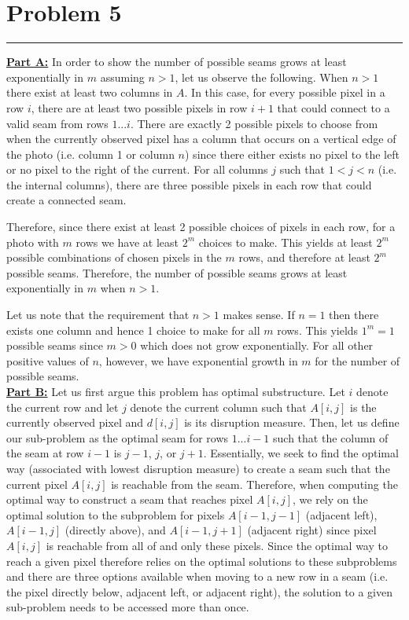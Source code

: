 \documentclass[11pt]{article}
\def\separateline{\medskip\hrule\medskip}
\begin{document}
\newpage

\section{Problem 5}
\separateline

\textbf{\underline{Part A:}} In order to show the number of possible seams grows at least exponentially in $m$ assuming $n > 1$, let us observe the following. When $n > 1$ there exist at least two columns in $A$. In this case, for every possible pixel in a row $i$, there are at least two possible pixels in row $i+1$ that could connect to a valid seam from rows $1...i$. There are exactly 2 possible pixels to choose from when the currently observed pixel has a column that occurs on a vertical edge of the photo (i.e. column 1 or column $n$) since there either exists no pixel to the left or no pixel to the right of the current. For all columns $j$ such that $1 < j < n$ (i.e. the internal columns), there are three possible pixels in each row that could create a connected seam.

Therefore, since there exist at least 2 possible choices of pixels in each row, for a photo with $m$ rows we have at least $2^m$ choices to make. This yields at least $2^m$ possible combinations of chosen pixels in the $m$ rows, and therefore at least $2^m$ possible seams. Therefore, the number of possible seams grows at least exponentially in $m$ when $n > 1$.

Let us note that the requirement that $n > 1$ makes sense. If $n=1$ then there exists one column and hence 1 choice to make for all $m$ rows. This yields $1^m = 1$ possible seams since $m>0$ which does not grow exponentially. For all other positive values of $n$, however, we have exponential growth in $m$ for the number of possible seams.\\

\textbf{\underline{Part B:}} Let us first argue this problem has optimal substructure. Let $i$ denote the current row and let $j$ denote the current column such that $A[i,j]$ is the currently observed pixel and $d[i,j]$ is its disruption measure. Then, let us define our sub-problem as the optimal seam for rows $1...i-1$ such that the column of the seam at row $i-1$ is $j-1$, $j$, or $j+1$. Essentially, we seek to find the optimal way (associated with lowest disruption measure) to create a seam such that the current pixel $A[i,j]$ is reachable from the seam. Therefore, when computing the optimal way to construct a seam that reaches pixel $A[i,j]$, we rely on the optimal solution to the subproblem for pixels $A[i-1,j-1]$ (adjacent left), $A[i-1,j]$ (directly above), and $A[i-1,j+1]$ (adjacent right) since pixel $A[i,j]$ is reachable from all of and only these pixels. Since the optimal way to reach a given pixel therefore relies on the optimal solutions to these subproblems and there are three options available when moving to a new row in a seam (i.e. the pixel directly below, adjacent left, or adjacent right), the solution to a given sub-problem needs to be accessed more than once.
\end{document}
